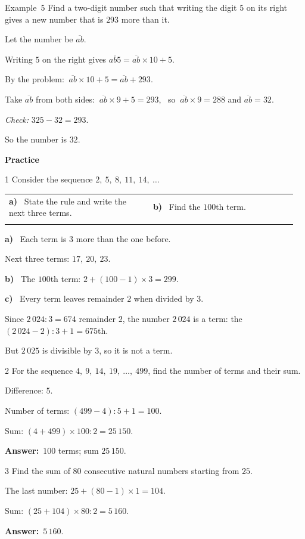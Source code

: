 \documentclass[11pt]{article}
\makeatletter
\newif\ifsol \solfalse
\renewcommand{\arraystretch}{1.35}
\providecommand{\AnsWord}{Đáp số}
\newcommand{\dapso}[1]{\par\textbf{\AnsWord:}\ #1}
\newcommand{\guide}{\par\vspace{4pt}{\bfseries\color{tmBlue}\GuideWord}\par\vspace{3pt}\nopagebreak}
\newcommand{\probsol}[1]{%
  \begin{lrbox}{\solmeasure}\begin{minipage}{\dimexpr\linewidth-24pt\relax}#1\end{minipage}\end{lrbox}%
  \ifsol
    \begin{solbox}#1\end{solbox}%
  \else
    \setlength{\solht}{\dimexpr\ht\solmeasure+\dp\solmeasure+0.85cm\relax}%
    \ifdim\solht<1.35cm\setlength{\solht}{1.35cm}\fi
    \begin{tcolorbox}[colback=white,colframe=Line,boxrule=0.8pt,arc=5pt,
      left=8pt,right=8pt,top=4pt,bottom=4pt,height=\solht]{\footnotesize\color{Slate}\itshape\WorkWord}\end{tcolorbox}%
  \fi}
\newcommand{\dividerbar}[1]{\par\vspace{0.6em}\noindent
  \begin{tcolorbox}[enhanced,frame hidden,interior hidden,borderline west={5pt}{0pt}{ProbBlue},
    colback=white,left=12pt,right=12pt,top=5pt,bottom=5pt,arc=4pt]
  {\large\bfseries\color{ProbBlue} #1}\end{tcolorbox}\vspace{0.4em}}
\newcommand{\nd}[1]{\overline{#1}}
\newcommand{\pa}[1]{\textbf{#1)}\ }
\newenvironment{cols2}{\par\vspace{3pt}\noindent\setlength{\tabcolsep}{0pt}\renewcommand{\arraystretch}{1.3}%
  \begin{tabular}{@{}>{\raggedright\arraybackslash\rule{0pt}{4.4ex}}p{0.48\linewidth}<{\rule[-2.3ex]{0pt}{0pt}}@{\hspace{0.03\linewidth}}>{\raggedright\arraybackslash\rule{0pt}{4.4ex}}p{0.48\linewidth}<{\rule[-2.3ex]{0pt}{0pt}}@{}}}%
  {\end{tabular}\par}
\newcommand{\gap}{\vspace{0.3cm}}
\def\GuideWord{Guided solution.}
\def\WorkWord{Your work:}
\def\AnsWord{Answer}
\def\ExWord{Example}
\makeatother
\begin{document}
\gap
\begin{exbox}{\ExWord\ 5}
Find a two-digit number such that writing the digit $5$ on its right gives a new number that is $293$ more than it.
\guide
Let the number be $\nd{ab}$.\par Writing $5$ on the right gives $\nd{ab5}=\nd{ab}\times10+5$.\par
By the problem: $\ \nd{ab}\times10+5=\nd{ab}+293$.\par
Take $\nd{ab}$ from both sides: $\ \nd{ab}\times9+5=293$, \ so $\ \nd{ab}\times9=288$ and $\nd{ab}=32$.\par
\emph{Check:} $325-32=293$.\par So the number is $32$.
\end{exbox}
\dividerbar{Practice}
\begin{probbox}{1}{\relax}
Consider the sequence $2,\ 5,\ 8,\ 11,\ 14,\ \dots$
\begin{cols2}
\pa{a} State the rule and write the next three terms. & \pa{b} Find the $100$th term.\\
\multicolumn{2}{@{}l@{}}{\pa{c} Do $2\,024$ and $2\,025$ belong to the sequence? If so, which term is it?}
\end{cols2}
\end{probbox}
\probsol{
\pa{a} Each term is $3$ more than the one before.\par Next three terms: $17,\ 20,\ 23$.\par
\pa{b} The $100$th term: $2+(100-1)\times3=299$.\par
\pa{c} Every term leaves remainder $2$ when divided by $3$.\par Since $2\,024:3=674$ remainder $2$, the number $2\,024$ is a term: the $(2\,024-2):3+1=675$th.\par But $2\,025$ is divisible by $3$, so it is not a term.
}
\gap
\begin{probbox}{2}{\relax}
For the sequence $4,\ 9,\ 14,\ 19,\ \dots,\ 499$, find the number of terms and their sum.
\end{probbox}
\probsol{
Difference: $5$.\par Number of terms: $(499-4):5+1=100$.\par
Sum: $(4+499)\times100:2=25\,150$.
\dapso{$100$ terms; sum $25\,150$.}}
\gap
\begin{probbox}{3}{\relax}
Find the sum of $80$ consecutive natural numbers starting from $25$.
\end{probbox}
\probsol{
The last number: $25+(80-1)\times1=104$.\par
Sum: $(25+104)\times80:2=5\,160$.
\dapso{$5\,160$.}}
\end{document}
